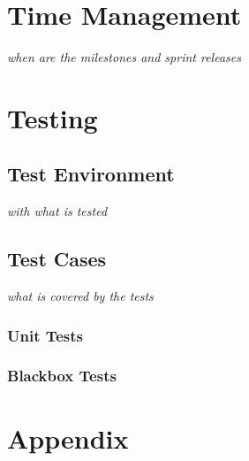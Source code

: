 \documentclass[a4paper, 10pt, fleqn]{article}
\begin{document}
	\section{Time Management}
		\textit{when are the milestones and sprint releases}
	\section{Testing}
		\subsection{Test Environment}
			\textit{with what is tested}
		\subsection{Test Cases}
			\textit{what is covered by the tests}
			\subsubsection{Unit Tests}
			\subsubsection{Blackbox Tests}

\clearpage
\thispagestyle{empty}
	\section*{Appendix}
\end{document}
